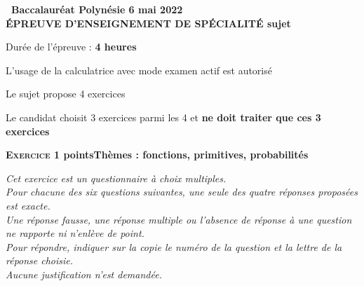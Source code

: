 \documentclass[10pt,a4paper]{article}
\begin{document}
\begin{center}{\Large\textbf{\decofourleft~Baccalauréat Polynésie 6 mai 2022~\decofourright\\[6pt] ÉPREUVE D'ENSEIGNEMENT DE SPÉCIALITÉ sujet }}

\bigskip

Durée de l'épreuve : \textbf{4 heures}

\medskip

L'usage de la calculatrice avec mode examen actif est autorisé

\medskip

Le sujet propose 4 exercices

Le candidat choisit 3 exercices parmi les 4 et \textbf{ne doit traiter que ces 3 exercices}
\end{center}

\bigskip

\textbf{\textsc{Exercice 1}  points\hfill Thèmes : fonctions, primitives, probabilités}

\medskip

\emph{Cet exercice est un questionnaire à choix multiples. \\
Pour chacune des six questions suivantes, une seule des quatre réponses proposées est exacte.\\
Une réponse fausse, une réponse multiple ou l'absence de réponse à une question ne rapporte ni n'enlève de point.\\
Pour répondre, indiquer sur la copie le numéro de la question et la lettre de la réponse choisie.\\
Aucune justification n'est demandée.}

\medskip
\end{document}
